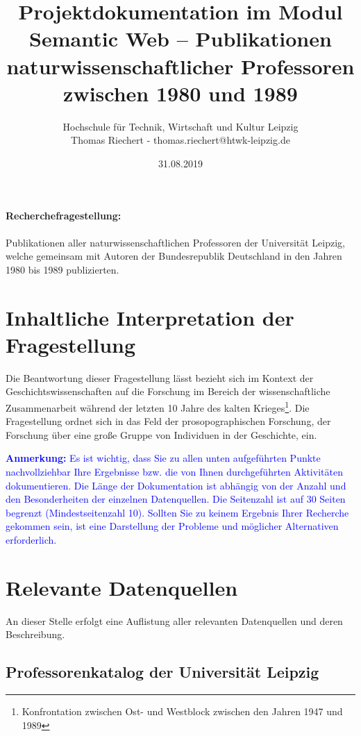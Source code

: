 \documentclass[a4paper,10pt,parskip]{article}
\title{Projektdokumentation im Modul Semantic Web -- Publikationen naturwissenschaftlicher Professoren zwischen 1980 und 1989}
\author{Hochschule für Technik, Wirtschaft und Kultur Leipzig\\Thomas Riechert - thomas.riechert@htwk-leipzig.de}
\date{31.08.2019}
\begin{document}
\maketitle


\paragraph{Recherchefragestellung: }
Publikationen aller naturwissenschaftlichen Professoren der Universität Leipzig, welche gemeinsam mit Autoren der Bundesrepublik Deutschland in den Jahren 1980 bis 1989 publizierten.


\section{Inhaltliche Interpretation der Fragestellung}

Die Beantwortung dieser Fragestellung lässt bezieht sich im Kontext der Geschichtswissenschaften auf die Forschung im Bereich der wissenschaftliche Zusammenarbeit während der letzten 10 Jahre des kalten Krieges\footnote{Konfrontation zwischen Ost- und Westblock zwischen den Jahren 1947 und 1989}. Die Fragestellung ordnet sich in das Feld der prosopographischen Forschung, der Forschung über eine große Gruppe von Individuen in der Geschichte, ein.

\vspace{0.5cm}\textcolor{blue}{\textbf{Anmerkung:} Es ist wichtig, dass Sie zu allen unten aufgeführten Punkte nachvollziehbar Ihre Ergebnisse bzw. die von Ihnen durchgeführten Aktivitäten dokumentieren. Die Länge der Dokumentation ist abhängig von der Anzahl und den Besonderheiten der einzelnen Datenquellen. Die Seitenzahl ist auf 30 Seiten begrenzt (Mindestseitenzahl 10). Sollten Sie zu keinem Ergebnis Ihrer Recherche gekommen sein, ist eine Darstellung der Probleme und möglicher Alternativen erforderlich.}

\section{Relevante Datenquellen}

An dieser Stelle erfolgt eine Auflistung aller relevanten Datenquellen und deren Beschreibung.

\subsection{Professorenkatalog der Universität Leipzig}
\end{document}
